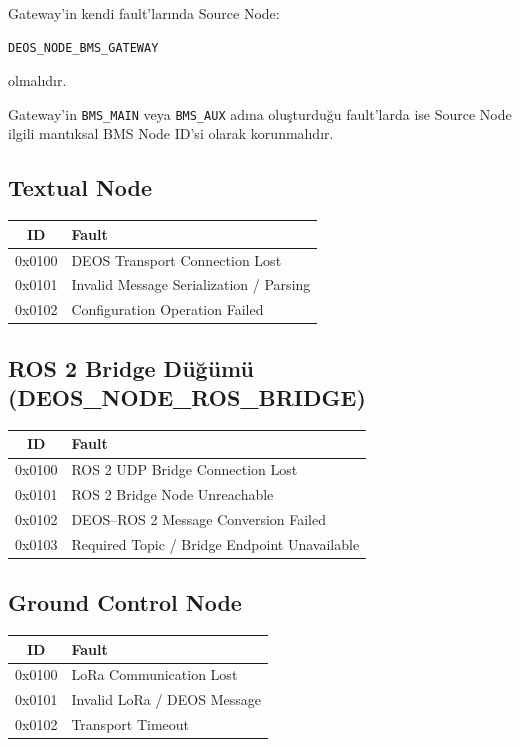 \documentclass[a4paper,11pt]{article}
\begin{document}
Gateway'in kendi fault'larında Source Node:

\begin{lstlisting}
DEOS_NODE_BMS_GATEWAY
\end{lstlisting}

olmalıdır.

Gateway'in \texttt{BMS\_MAIN} veya \texttt{BMS\_AUX} adına oluşturduğu fault'larda ise
Source Node ilgili mantıksal BMS Node ID'si olarak korunmalıdır.

\subsection{Textual Node}

\begin{center}
\begin{tabular}{c l}
\toprule
\textbf{ID} & \textbf{Fault} \\
\midrule
0x0100 & DEOS Transport Connection Lost \\
0x0101 & Invalid Message Serialization / Parsing \\
0x0102 & Configuration Operation Failed \\
\bottomrule
\end{tabular}
\end{center}

\subsection{ROS 2 Bridge Düğümü (DEOS\_NODE\_ROS\_BRIDGE)}

\begin{center}
\begin{tabular}{c l}
\toprule
\textbf{ID} & \textbf{Fault} \\
\midrule
0x0100 & ROS 2 UDP Bridge Connection Lost \\
0x0101 & ROS 2 Bridge Node Unreachable \\
0x0102 & DEOS--ROS 2 Message Conversion Failed \\
0x0103 & Required Topic / Bridge Endpoint Unavailable \\
\bottomrule
\end{tabular}
\end{center}

\subsection{Ground Control Node}

\begin{center}
\begin{tabular}{c l}
\toprule
\textbf{ID} & \textbf{Fault} \\
\midrule
0x0100 & LoRa Communication Lost \\
0x0101 & Invalid LoRa / DEOS Message \\
0x0102 & Transport Timeout \\
\bottomrule
\end{tabular}
\end{center}
\end{document}
